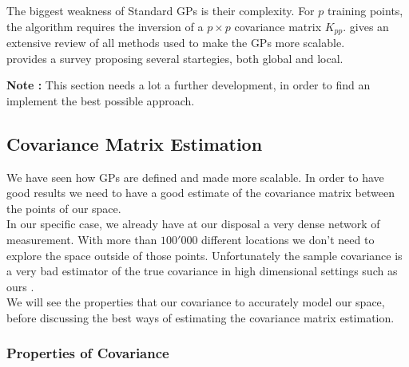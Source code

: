 \documentclass[12pt,twoside]{report}
\begin{document}
The biggest weakness of Standard GPs is their complexity. For $p$ training points, the algorithm requires the inversion of a $p \times p$ covariance matrix $K_{pp}$. \citet{liu_when_2018} gives an extensive review of all methods used to make the GPs more scalable. \\

\citet{liu_when_2018} provides a survey proposing several startegies, both global and local. 


\textbf{Note :} This section needs a lot a further development, in order to find an implement the best possible approach. 

\subsection{Covariance Matrix Estimation} \label{sec:cov_est}

We have seen how GPs are defined and made more scalable. In order to have good results we need to have a good estimate of the covariance matrix between the points of our space. \\




In our specific case, we already have at our disposal a very dense network of measurement. With more than $100'000$ different locations we don't need to explore the space outside of those points. Unfortunately the sample covariance is a very bad estimator of the true covariance in high dimensional settings such as ours \citep{pourahmadi_covariance_2011}. \\


We will see the properties that our covariance to accurately model our space, before discussing the best ways of estimating the covariance matrix estimation.


\subsubsection{Properties of Covariance}
\end{document}

